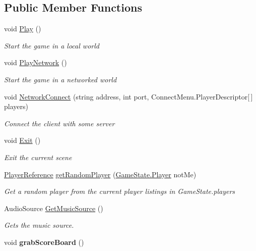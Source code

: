 \subsection*{Public Member Functions}
\begin{DoxyCompactItemize}
\item 
void \hyperlink{class_game_manager_a3403831c40f16191e3997be60d95380b}{Play} ()
\begin{DoxyCompactList}\small\item\em Start the game in a local world \end{DoxyCompactList}\item 
void \hyperlink{class_game_manager_a1138f86278583414cba9456d02d0fa1c}{Play\-Network} ()
\begin{DoxyCompactList}\small\item\em Start the game in a networked world \end{DoxyCompactList}\item 
void \hyperlink{class_game_manager_a3c3a8e05664851d7642c13989af691cf}{Network\-Connect} (string address, int port, Connect\-Menu.\-Player\-Descriptor\mbox{[}$\,$\mbox{]} players)
\begin{DoxyCompactList}\small\item\em Connect the client with some server \end{DoxyCompactList}\item 
void \hyperlink{class_game_manager_a5d9cafdd495a4ed2760de13b7b9c80b6}{Exit} ()
\begin{DoxyCompactList}\small\item\em Exit the current scene \end{DoxyCompactList}\item 
\hyperlink{class_player_reference}{Player\-Reference} \hyperlink{class_game_manager_aadd5e389068b81b09036cc2bb8c097d6}{get\-Random\-Player} (\hyperlink{class_game_state_1_1_player}{Game\-State.\-Player} not\-Me)
\begin{DoxyCompactList}\small\item\em Get a random player from the current player listings in Game\-State.\-players \end{DoxyCompactList}\item 
Audio\-Source \hyperlink{class_game_manager_abf59d5ce551af5e35529f71a99d89d76}{Get\-Music\-Source} ()
\begin{DoxyCompactList}\small\item\em Gets the music source. \end{DoxyCompactList}\item 
\hypertarget{class_game_manager_a414dcfd0d1f5a5904d2440165e42923d}{void {\bfseries grab\-Score\-Board} ()}\label{class_game_manager_a414dcfd0d1f5a5904d2440165e42923d}


\end{DoxyCompactItemize}
